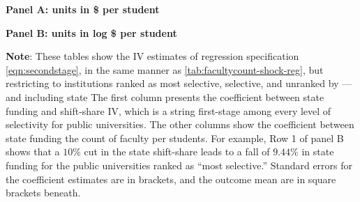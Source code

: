 \begin{table}[H]
    \singlespacing
    \centering
    \caption{Effects of State Funding on Faculty Counts, IPEDS 1990--2021, IV Estimates by Institution Selectivity.}

    \textbf{Panel A: units in \$ per student}

    
        \vspace{0.2cm}
    \textbf{Panel B: units in log \$ per student}
    
    \label{tab:facultycount-heterogeneity}
    \justify
    \footnotesize
    \textbf{Note}:
    These tables show the IV estimates of regression specification \eqref{eqn:secondstage}, 
    in the same manner as \autoref{tab:facultycount-shock-reg}, but restricting to institutions ranked as most selective, selective, and unranked by \cite{barrons2009} --- and including state
    The first column presents the coefficient between state funding and shift-share IV, which is a string first-stage among every level of selectivity for public universities.
    The other columns show the coefficient between state funding the count of faculty per students.
    For example, Row 1 of panel B shows that a $10\%$ cut in the state shift-share leads to a fall of $9.44\%$ in state funding for the public universities ranked as ``most selective.''
    Standard errors for the coefficient estimates are in brackets, and the outcome mean are in square brackets beneath.
\end{table}

